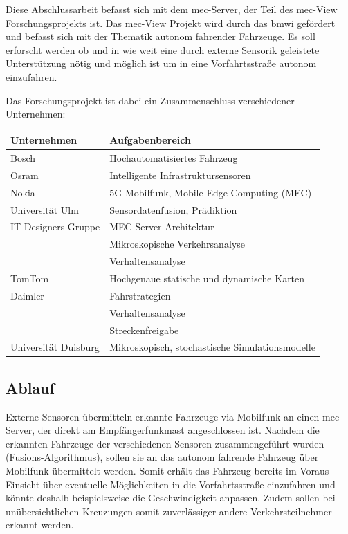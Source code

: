 Diese Abschlussarbeit befasst sich mit dem \gls{mec}-Server, der Teil des \gls{mec}-View Forschungsprojekts ist.
Das \gls{mec}-View Projekt wird durch das \gls{bmwi} gefördert und befasst sich mit der Thematik autonom fahrender Fahrzeuge.
Es soll erforscht werden ob und in wie weit eine durch externe Sensorik geleistete Unterstützung nötig und möglich ist um in eine Vorfahrtsstraße autonom einzufahren.

Das Forschungsprojekt ist dabei ein Zusammenschluss verschiedener Unternehmen:
\begin{center}
	\begin{tabular}{l|l}		
		Unternehmen & Aufgabenbereich \\ \hline \hline
		Bosch & Hochautomatisiertes Fahrzeug \\
		Osram & \glqq{}Intelligente\grqq{} Infrastruktursensoren \\ 
		Nokia & 5G Mobilfunk, Mobile Edge Computing (MEC) \\
		Universität Ulm & Sensordatenfusion, Prädiktion \\
		\rowcolor{lightgray!20} IT-Designers Gruppe & MEC-Server Architektur\\
		\rowcolor{lightgray!20} & Mikroskopische Verkehrsanalyse \\
		\rowcolor{lightgray!20} & Verhaltensanalyse \\
		TomTom & Hochgenaue statische und dynamische Karten \\
		Daimler & Fahrstrategien \\
		& Verhaltensanalyse \\
		& Streckenfreigabe \\
		Universität Duisburg & Mikroskopisch, stochastische Simulationsmodelle
	\end{tabular}
\end{center}


\subsection{Ablauf}
Externe Sensoren übermitteln erkannte Fahrzeuge via Mobilfunk an einen \gls{mec}-Server, der direkt am Empfängerfunkmast angeschlossen ist. 
Nachdem die erkannten Fahrzeuge der verschiedenen Sensoren zusammengeführt wurden (Fusions-Algorithmus), sollen sie an das autonom fahrende Fahrzeug über Mobilfunk übermittelt werden.
Somit erhält das Fahrzeug bereits im Voraus Einsicht über eventuelle Möglichkeiten in die Vorfahrtsstraße einzufahren und könnte deshalb beispielsweise die Geschwindigkeit anpassen.
Zudem sollen bei unübersichtlichen Kreuzungen somit zuverlässiger andere Verkehrsteilnehmer erkannt werden.

